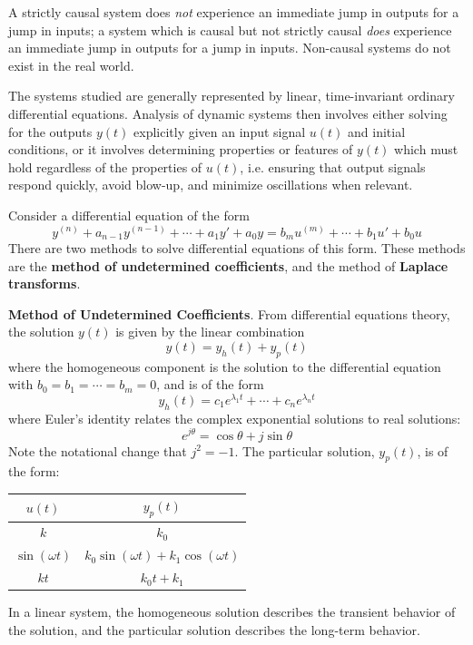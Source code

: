 A strictly causal system does \textit{not} experience an immediate jump in outputs for a jump in inputs; a system which is causal but not strictly causal \textit{does} experience an immediate jump in outputs for a jump in inputs. Non-causal systems do not exist in the real world.

The systems studied are generally represented by linear, time-invariant ordinary differential equations. Analysis of dynamic systems then involves either solving for the outputs $y(t)$ explicitly given an input signal $u(t)$ and initial conditions, or it involves determining properties or features of $y(t)$ which must hold regardless of the properties of $u(t)$, i.e. ensuring that output signals respond quickly, avoid blow-up, and minimize oscillations when relevant.


Consider a differential equation of the form \[y^{(n)} + a_{n-1}y^{(n-1)}+\cdots+a_1y' + a_0y = b_mu^{(m)} + \cdots + b_1 u' + b_0u\] There are two methods to solve differential equations of this form. These methods are the \textbf{method of undetermined coefficients}, and the method of \textbf{Laplace transforms}.

\begin{framed}
\textbf{Method of Undetermined Coefficients}. From differential equations theory, the solution $y(t)$ is given by the linear combination \[y(t) = y_h(t) + y_p(t)\] where the homogeneous component is the solution to the differential equation with $b_0=b_1=\cdots=b_m=0$, and is of the form \[y_h(t) = c_1 e^{\lambda_1 t} + \cdots + c_n e^{\lambda_n t}\] where Euler's identity relates the complex exponential solutions to real solutions: \[e^{j\theta} = \cos\theta + j\sin\theta\] Note the notational change that $j^2=-1$. The particular solution, $y_p(t)$, is of the form:

\begin{center}
    \begin{tabular}{c|c}
        $u(t)$ & $y_p(t)$ \\
        \hline\hline
        $k$ & $k_0$ \\
        $\sin(\omega t)$ & $k_0\sin(\omega t) + k_1\cos(\omega t)$\\
        $kt$ & $k_0 t + k_1$\\
        \end{tabular}
\end{center}

In a linear system, the homogeneous solution describes the transient behavior of the solution, and the particular solution describes the long-term behavior.
\end{framed}

